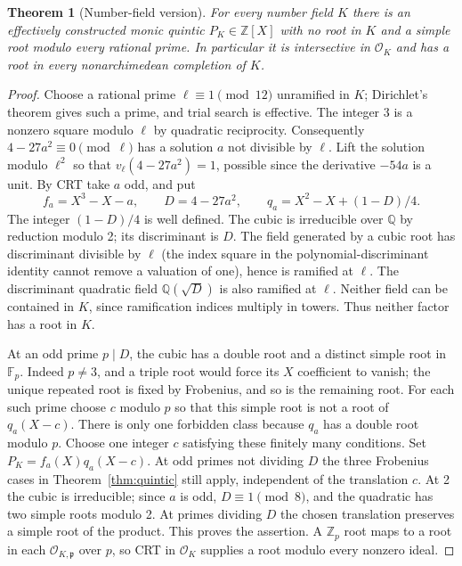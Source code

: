 \documentclass[11pt]{article}
\newtheorem{theorem}{Theorem}[section]
\newcommand{\Q}{\mathbb Q}\newcommand{\Z}{\mathbb Z}\newcommand{\N}{\mathbb N}
\newcommand{\OK}{\mathcal O_K}\newcommand{\vp}{v_p}\newcommand{\Sp}{\operatorname{Spec}}
\begin{document}
\begin{theorem}[Number-field version]\label{thm:nf}
For every number field $K$ there is an effectively constructed monic
quintic $P_K\in\Z[X]$ with no root in $K$ and a simple root modulo every
rational prime. In particular it is intersective in $\OK$ and has a root
in every nonarchimedean completion of $K$.
\end{theorem}
\begin{proof}
Choose a rational prime $\ell\equiv1\pmod {12}$ unramified in $K$;
Dirichlet's theorem gives such a prime, and trial search is effective.
The integer 3 is a nonzero square modulo $\ell$ by quadratic reciprocity.
Consequently $4-27a^2\equiv0\pmod\ell$ has a solution $a$ not divisible
by $\ell$. Lift the solution modulo $\ell^2$ so that
$v_\ell(4-27a^2)=1$, possible since the derivative $-54a$ is a unit.
By CRT take $a$ odd, and put
\[
 f_a=X^3-X-a,\qquad D=4-27a^2,\qquad q_a=X^2-X+(1-D)/4.
\]
The integer $(1-D)/4$ is well defined. The cubic is irreducible over
$\Q$ by reduction modulo 2; its discriminant is $D$. The field generated
by a cubic root has discriminant divisible by $\ell$ (the index square
in the polynomial-discriminant identity cannot remove a valuation of
one), hence is ramified at $\ell$. The discriminant quadratic field
$\Q(\sqrt D)$ is also ramified at $\ell$. Neither field can be contained
in $K$, since ramification indices multiply in towers. Thus neither
factor has a root in $K$.

At an odd prime $p\mid D$, the cubic has a double root and a distinct
simple root in $\mathbb F_p$. Indeed $p\ne3$, and a triple root would
force its $X$ coefficient to vanish; the unique repeated root is fixed
by Frobenius, and so is the remaining root. For each such prime choose
$c$ modulo $p$ so that this simple root is not a root of $q_a(X-c)$.
There is only one forbidden class because $q_a$ has a double root modulo
$p$. Choose one integer $c$ satisfying these finitely many conditions.
Set $P_K=f_a(X)q_a(X-c)$. At odd primes not dividing $D$ the three
Frobenius cases in Theorem~\ref{thm:quintic} still apply, independent of
the translation $c$. At 2 the cubic is irreducible; since $a$ is odd,
$D\equiv1\pmod8$, and the quadratic has two simple roots modulo 2.
At primes dividing $D$ the chosen translation preserves a simple root
of the product. This proves the assertion. A $\Z_p$ root maps to a root
in each $\mathcal O_{K,\mathfrak p}$ over $p$, so CRT in $\OK$ supplies
a root modulo every nonzero ideal.
\end{proof}
\end{document}
